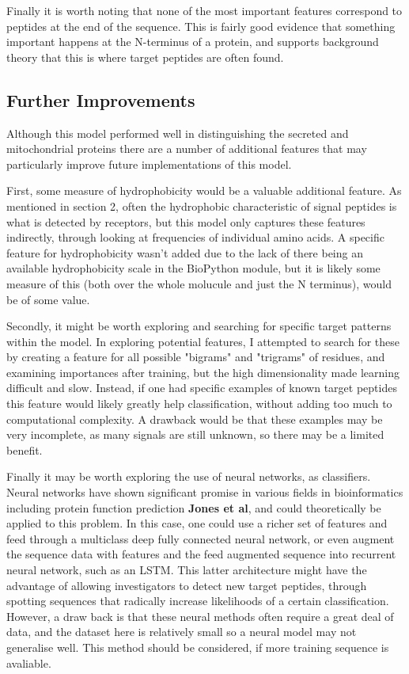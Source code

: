 \documentclass{bioinfo}
\begin{document}
Finally it is worth noting that none of the most important features correspond to peptides at the end of the sequence.  This is fairly good evidence that something important happens at the N-terminus of a protein, and  supports background theory that this is where target peptides are often found.


\subsection{Further Improvements}

Although this model performed well in distinguishing the secreted and mitochondrial proteins there are a number of additional features that may particularly improve future implementations of this model. 

First, some measure of hydrophobicity would be a valuable additional feature. 
As mentioned in section 2, often the hydrophobic characteristic of signal peptides is what is detected by receptors, but this model only captures these features indirectly, through looking at frequencies of individual amino acids.
A specific feature for hydrophobicity wasn't added due to the lack of there being an available hydrophobicity scale in the BioPython module, but it is likely some measure of this  (both over the whole molucule and just the N terminus), would be of some value.

Secondly, it might be worth exploring and searching for specific target patterns within the model. 
In exploring potential features, I attempted to search for these by creating a feature for all possible "bigrams" and "trigrams" of residues, and examining importances after training, but the high dimensionality made learning difficult and slow. 
Instead, if one had specific examples of known target peptides this feature would likely greatly help classification, without adding too much to computational complexity.
A drawback would be that these examples may be very incomplete, as many signals are still unknown, so there may be a limited benefit.

Finally it may be worth exploring the use of neural networks, as classifiers.
Neural networks have shown significant promise in various fields in bioinformatics including protein function prediction \textbf{Jones et al}, and could theoretically be applied to this problem. 
In this case, one could use a richer set of features and feed through a multiclass deep fully connected neural network, or even augment the sequence data with features and the feed augmented sequence into recurrent neural network, such as an LSTM. 
This latter architecture might have the advantage of allowing investigators to detect new target peptides, through spotting sequences that radically increase likelihoods of a certain classification.
However, a draw back is that these neural methods often require a great deal of data, and the dataset here is relatively small so a neural model may not generalise well.
This method should be considered, if more training sequence is avaliable.
\end{document}
